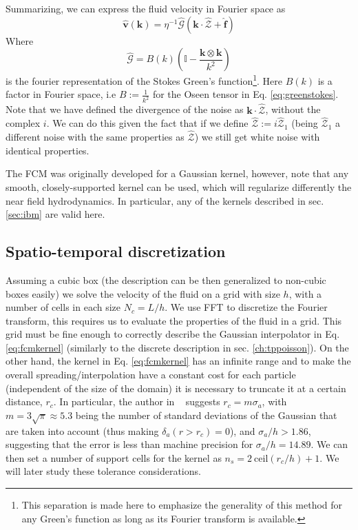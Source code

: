 \documentclass[twoside,openright,titlepage,numbers=noenddot,%
headinclude,footinclude,cleardoublepage=empty,abstract=on,
BCOR=5mm,fontsize=11pt, dvipsnames, paper=b5
]{scrreprt}
\renewcommand{\vec}[1]{\bm{#1}}
\newcommand{\tens}[1]{\bm{\mathcal{#1}}}
\newcommand{\fou}[1]{\widehat{#1}}
\newcommand{\fvel}{v}
\begin{document}
Summarizing, we can express the fluid velocity in Fourier space as
\begin{equation}
  \label{eq:fcmvel}
  \fou{\vec{\fvel}}(\vec{k}) = \eta^{-1}\hat{\tens{G}}\left(\vec{k}\cdot\fou{\mathcal{Z}} + \fou{\vec{f}}\right)
\end{equation}
Where
\begin{equation}
  \fou{\tens{G}} = B(k)\left(\mathbb{I} - \frac{\vec{k}\otimes\vec{k}}{k^2}\right)
\end{equation}
is the fourier representation of the Stokes Green's function\footnote{This separation is made here to emphasize the generality of this method for any Green's function as long as its Fourier transform is available.}.
Here $B(k)$ is a factor in Fourier space, i.e $B := \frac{1}{k^2}$ for the Oseen tensor in Eq. \eqref{eq:greenstokes}.
Note that we have defined the divergence of the noise as $\vec{k}\cdot\fou{\mathcal{Z}}$, without the complex $i$. We can do this given the fact that if we define $\fou{\mathcal{Z}} := i\fou{\mathcal{Z}}_1$ (being $\fou{\mathcal{Z}}_1$ a different noise with the same properties as $\fou{\mathcal{Z}}$) we still get white noise with identical properties.

The \gls{FCM} was originally developed for a Gaussian kernel, however, note that any smooth, closely-supported kernel can be used, which will regularize differently the near field hydrodynamics. In particular, any of the kernels described in sec. \ref{sec:ibm} are valid here.

\subsection*{Spatio-temporal discretization}
Assuming a cubic box (the description can be then generalized to non-cubic boxes easily) we solve the velocity of the fluid on a grid with size $h$, with a number of cells in each size $N_c = L/h$.
We use \gls{FFT} to discretize the Fourier transform, this requires us to evaluate the properties of the fluid in a grid. This grid must be fine enough to correctly describe the Gaussian interpolator in Eq. \eqref{eq:fcmkernel} (similarly to the discrete description in sec. \ref{ch:tppoisson}). On the other hand, the kernel in Eq. \eqref{eq:fcmkernel} has an infinite range and to make the overall spreading/interpolation have a constant cost for each particle (independent of the size of the domain) it is necessary to truncate it at a certain distance, $r_c$. In particular, the author in ~\cite{Keaveny2014} suggests $r_c=m \sigma_a$, with $m=3\sqrt{\pi}\approx 5.3$ being the number of standard deviations of the Gaussian that are taken into account (thus making $\delta_a(r>r_c) = 0$), and $\sigma_a/h > 1.86$, suggesting that the error is less than machine precision for $\sigma_a/h = 14.89$. We can then set a number of support cells for the kernel as $n_s = 2\ \textrm{ceil}(r_c/h)+1$.
We will later study these tolerance considerations.
\end{document}
